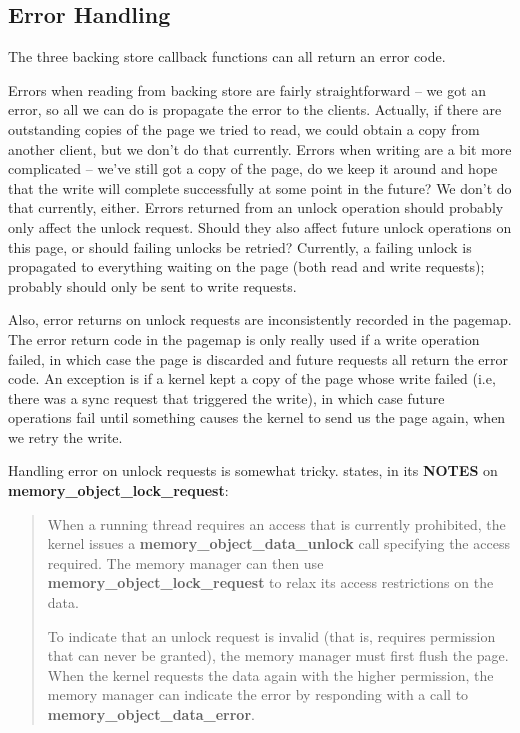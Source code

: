 \documentclass{article}
\begin{document}
\subsection{Error Handling}

The three backing store callback functions can all return an error
code.

Errors when reading from backing store are fairly straightforward --
we got an error, so all we can do is propagate the error to the
clients.  Actually, if there are outstanding copies of the page we
tried to read, we could obtain a copy from another client, but we
don't do that currently.  Errors when writing are a bit more
complicated -- we've still got a copy of the page, do we keep it
around and hope that the write will complete successfully at some
point in the future?  We don't do that currently, either.  Errors
returned from an unlock operation should probably only affect the
unlock request.  Should they also affect future unlock operations on
this page, or should failing unlocks be retried?  Currently, a failing
unlock is propagated to everything waiting on the page (both read and
write requests); probably should only be sent to write requests.

Also, error returns on unlock requests are inconsistently recorded in
the pagemap.  The error return code in the pagemap is only really used
if a write operation failed, in which case the page is discarded and
future requests all return the error code.  An exception is if a
kernel kept a copy of the page whose write failed (i.e, there was a
sync request that triggered the write), in which case future
operations fail until something causes the kernel to send us the page
again, when we retry the write.

Handling error on unlock requests is somewhat tricky.
\cite{interfaces} states, in its {\bf NOTES} on {\bf
  memory_object_lock_request}:

\begin{quote}
When a running thread requires an access that is currently prohibited,
the kernel issues a {\bf memory_object_data_unlock} call specifying
the access required. The memory manager can then use {\bf
  memory_object_lock_request} to relax its access restrictions on the
data.

To indicate that an unlock request is invalid (that is, requires
permission that can never be granted), the memory manager must first
flush the page. When the kernel requests the data again with the
higher permission, the memory manager can indicate the error by
responding with a call to {\bf memory_object_data_error}.
\end{quote}
\end{document}
